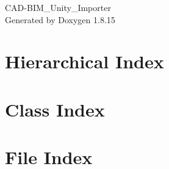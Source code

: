 \let\mypdfximage\pdfximage\def\pdfximage{\immediate\mypdfximage}\documentclass[twoside]{book}
\newcommand{\+}{\discretionary{\mbox{\scriptsize$\hookleftarrow$}}{}{}}
\newcommand{\clearemptydoublepage}{%
  \newpage{\pagestyle{empty}\cleardoublepage}%
}
\begin{document}
\hypersetup{pageanchor=false,
             bookmarksnumbered=true,
             pdfencoding=unicode
            }
\begin{titlepage}
\vspace*{7cm}
\begin{center}%
{\Large C\+A\+D-\/\+B\+I\+M\+\_\+\+Unity\+\_\+\+Importer }\\
\vspace*{1cm}
{\large Generated by Doxygen 1.8.15}\\
\end{center}
\end{titlepage}
\clearemptydoublepage
{}
\tableofcontents
\clearemptydoublepage
{}
\hypersetup{pageanchor=true}

\chapter{Hierarchical Index}

\chapter{Class Index}

\chapter{File Index}

\end{document}
